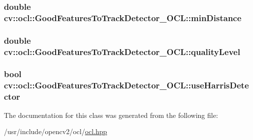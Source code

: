 \hypertarget{classcv_1_1ocl_1_1GoodFeaturesToTrackDetector__OCL_a984603138318d1a9a1ebc5a42461c7e4}{
\subsubsection[{min\-Distance}]{\setlength{\rightskip}{0pt plus 5cm}double cv\-::ocl\-::\-Good\-Features\-To\-Track\-Detector\-\_\-\-O\-C\-L\-::min\-Distance}}\label{classcv_1_1ocl_1_1GoodFeaturesToTrackDetector__OCL_a984603138318d1a9a1ebc5a42461c7e4}
\hypertarget{classcv_1_1ocl_1_1GoodFeaturesToTrackDetector__OCL_a19ac1b83bc6602c6a1a966e904ca215f}{
\subsubsection[{quality\-Level}]{\setlength{\rightskip}{0pt plus 5cm}double cv\-::ocl\-::\-Good\-Features\-To\-Track\-Detector\-\_\-\-O\-C\-L\-::quality\-Level}}\label{classcv_1_1ocl_1_1GoodFeaturesToTrackDetector__OCL_a19ac1b83bc6602c6a1a966e904ca215f}
\hypertarget{classcv_1_1ocl_1_1GoodFeaturesToTrackDetector__OCL_abf60ed728142b02145b86ad2c68f06c6}{
\subsubsection[{use\-Harris\-Detector}]{\setlength{\rightskip}{0pt plus 5cm}bool cv\-::ocl\-::\-Good\-Features\-To\-Track\-Detector\-\_\-\-O\-C\-L\-::use\-Harris\-Detector}}\label{classcv_1_1ocl_1_1GoodFeaturesToTrackDetector__OCL_abf60ed728142b02145b86ad2c68f06c6}


The documentation for this class was generated from the following file\-:\begin{DoxyCompactItemize}
\item 
/usr/include/opencv2/ocl/\hyperlink{ocl_2ocl_8hpp}{ocl.\-hpp}\end{DoxyCompactItemize}

